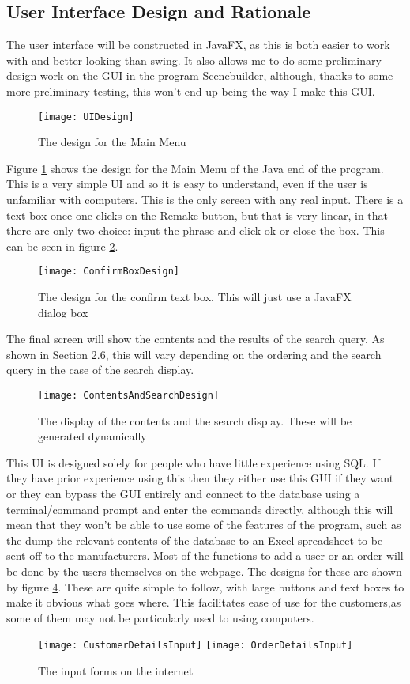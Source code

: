 \documentclass[
11pt, %
a4paper, %
oneside, %
headinclude,footinclude, %
BCOR5mm, %
]{scrartcl}
\begin{document}
\subsection{User Interface Design and Rationale}
The user interface will be constructed in JavaFX, as this is both easier to work with and better looking than swing. It also allows me to do some preliminary design work on the GUI in the program Scenebuilder, although, thanks to some more preliminary testing, this won't end up being the way I make this GUI. 
\begin{figure}
	\centering
	\texttt{[image: UIDesign]}
	\caption{The design for the Main Menu}
	\label{mmdes}	
\end{figure}
Figure \ref{mmdes} shows the design for the Main Menu of the Java end of the program. This is a very simple UI and so it is easy to understand, even if the user is unfamiliar with computers. This is the only screen with any real input. There is a text box once one clicks on the Remake button, but that is very linear, in that there are only two choice: input the phrase and click ok or close the box. This can be seen in figure \ref{confdes}.
\begin{figure}
	\centering
	\texttt{[image: ConfirmBoxDesign]}
	\caption{The design for the confirm text box. This will just use a JavaFX dialog box}
	\label{confdes}
\end{figure}
The final screen will show the contents and the results of the search query. As shown in Section 2.6, this will vary depending on the ordering and the search query in the case of the search display. 
\begin{figure}
	\centering
	\texttt{[image: ContentsAndSearchDesign]}
	\caption{The display of the contents and the search display. These will be generated dynamically}
	\label{searchdes}
\end{figure}
\par This UI is designed solely for people who have little experience using SQL. If they have prior experience using this then they either use this GUI if they want or they can bypass the GUI entirely and connect to the database using a terminal/command prompt and enter the commands directly, although this will mean that they won't be able to use some of the features of the program, such as the dump the relevant contents of the database to an Excel spreadsheet to be sent off to the manufacturers. Most of the functions to add a user or an order will be done by the users themselves on the webpage. The designs for these are shown by figure \ref{webcusdes}. These are quite simple to follow, with large buttons and text boxes to make it obvious what goes where. This facilitates ease of use for the customers,as some of them may not be particularly used to using computers.
\begin{figure}[H]
	\centering
	\texttt{[image: CustomerDetailsInput]}
	\texttt{[image: OrderDetailsInput]}
	\caption{The input forms on the internet}
	\label{webcusdes}	
\end{figure}
\end{document}

